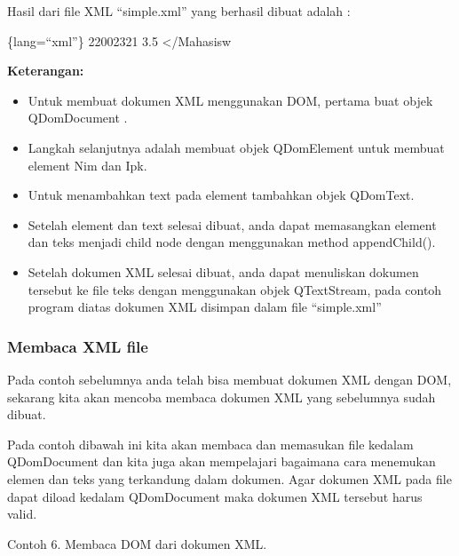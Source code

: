 Hasil dari file XML ``simple.xml'' yang berhasil dibuat adalah :

\{lang=``xml''\} 22002321 3.5 \textless{}/Mahasisw

\textbf{Keterangan:}

\begin{itemize}
\tightlist
\item
  Untuk membuat dokumen XML menggunakan DOM, pertama buat objek
  QDomDocument .
\item
  Langkah selanjutnya adalah membuat objek QDomElement untuk membuat
  element Nim dan Ipk.
\item
  Untuk menambahkan text pada element tambahkan objek QDomText.
\item
  Setelah element dan text selesai dibuat, anda dapat memasangkan
  element dan teks menjadi child node dengan menggunakan method
  appendChild().
\item
  Setelah dokumen XML selesai dibuat, anda dapat menuliskan dokumen
  tersebut ke file teks dengan menggunakan objek QTextStream, pada
  contoh program diatas dokumen XML disimpan dalam file ``simple.xml''
\end{itemize}

\subsubsection{Membaca XML file}\label{membaca-xml-file}

Pada contoh sebelumnya anda telah bisa membuat dokumen XML dengan DOM,
sekarang kita akan mencoba membaca dokumen XML yang sebelumnya sudah
dibuat.

Pada contoh dibawah ini kita akan membaca dan memasukan file kedalam
QDomDocument dan kita juga akan mempelajari bagaimana cara menemukan
elemen dan teks yang terkandung dalam dokumen. Agar dokumen XML pada
file dapat diload kedalam QDomDocument maka dokumen XML tersebut harus
valid.

Contoh 6. Membaca DOM dari dokumen XML.

